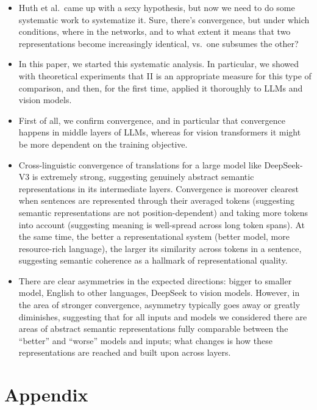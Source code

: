 \documentclass[10pt]{article} %
\begin{document}
\begin{itemize}
    \item Huth et al.~came up with a sexy hypothesis, but now we need to do some systematic work to systematize it. Sure, there's convergence, but under which conditions, where in the networks, and to what extent it means that two representations become increasingly identical, vs.~one subsumes the other?
    \item In this paper, we started this systematic analysis. In particular, we showed with theoretical experiments that II is an appropriate measure for this type of comparison, and then, for the first time, applied it thoroughly to LLMs and vision models.
    \item First of all, we confirm convergence, and in particular that convergence happens in middle layers of LLMs, whereas for vision transformers it might be more dependent on the training objective.
    \item Cross-linguistic convergence of translations for a large model like DeepSeek-V3 is extremely strong, suggesting genuinely abstract semantic representations in its intermediate layers. Convergence is moreover clearest when sentences are represented through their averaged tokens (suggesting semantic representations are not position-dependent) and taking more tokens into account (suggesting meaning is well-spread across long token spans). At the same time, the better a representational system (better model, more resource-rich language), the larger its similarity across tokens in a sentence, suggesting semantic coherence as a hallmark of representational quality. 
    \item There are clear asymmetries in the expected directions: bigger to smaller model, English to other languages, DeepSeek to vision models. However, in the area of stronger convergence, asymmetry typically goes away or greatly diminishes, suggesting that for all inputs and models we considered there are areas of abstract semantic representations fully comparable between the ``better'' and ``worse'' models and inputs; what changes is how these representations are reached and built upon across layers.
\end{itemize}




\appendix
\section{Appendix}
\end{document}
